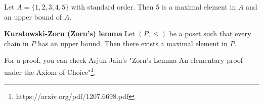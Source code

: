 \begin{example}
  Let $A=\{1,2,3,4,5\}$ with standard order. Then 5 is a maximal element in $A$ and an upper bound of $A$.
\end{example}

\begin{theorem}
  \textbf{Kuratowski-Zorn (Zorn's) lemma}
  Let $(P, \le)$ be a poset such that every chain in $P$ has an upper bound. Then there exists a maximal element in $P$.
\end{theorem}

For a proof, you can check Arjun Jain's "Zorn’s Lemma An elementary proof under the Axiom of Choice"\footnote{https://arxiv.org/pdf/1207.6698.pdf}.
